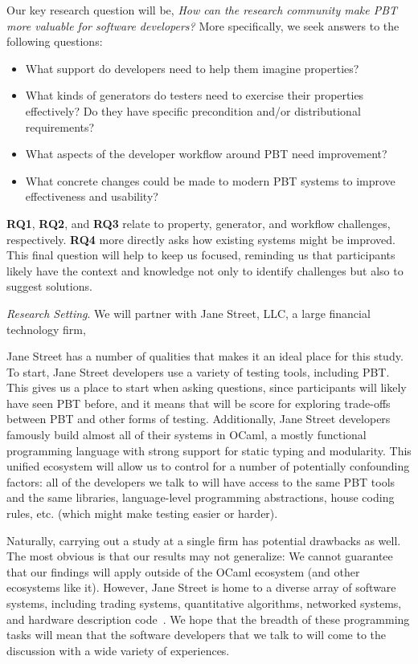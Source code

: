 Our key research question will be, \emph{How can the research community make PBT 
more valuable for software developers?} More specifically, we seek
answers to the following questions:

\begin{itemize}[noitemsep,leftmargin=4em]
\item[\bf RQ1.] What support do developers need to help them imagine properties? 
\item[\bf RQ2.] What kinds of generators do testers need to exercise their
  properties effectively? Do they have specific precondition and/or distributional
  requirements?
\item[\bf RQ3.] What aspects of the developer workflow around PBT need improvement?
\item[\bf RQ4.] What concrete changes could be made to modern PBT systems
  to improve effectiveness and usability?
\end{itemize}

{\bf RQ1}, {\bf RQ2}, and {\bf RQ3} relate to property,
generator, and workflow challenges, respectively.
{\bf RQ4} more directly asks how existing systems might
be improved. This final question will help to keep us focused,
reminding us that participants likely have the context and knowledge not
only to identify challenges but also to suggest
solutions.

\textit{Research Setting}. We will partner with Jane Street, LLC, a large
financial technology firm,


Jane Street has a number of qualities that makes it an ideal place for
this study. To start, Jane Street developers use
a variety of testing tools, including PBT. This gives us a place to start
when asking questions, since participants will likely have seen PBT before,
and it means that will be score for exploring trade-offs between PBT and
other forms of testing.
Additionally, Jane Street developers famously build almost all of their
systems in OCaml, a mostly functional programming language with strong support
for static typing and modularity. This unified ecosystem
will allow
us to control for a number of potentially confounding factors: all of the
developers we talk to will have access to the same PBT tools and the same
libraries, language-level programming abstractions, house coding rules,
etc. (which might make testing easier or harder).

Naturally, carrying out a study at a single firm has potential drawbacks as
well. The most obvious is that our results may not generalize: We
cannot guarantee that our findings will apply outside of the OCaml ecosystem (and
other ecosystems like it). However, Jane Street is home to a diverse array of
software systems, including trading systems, quantitative
algorithms, networked systems, and hardware description code~\cite{signalsandthreads}.
We hope that the breadth of these programming tasks will mean that the software
developers that we talk to will come to the discussion with a wide variety of
experiences.

